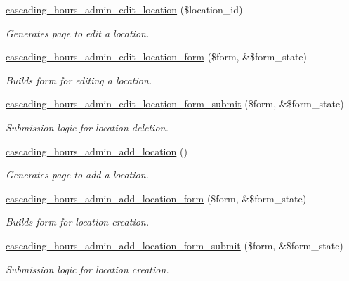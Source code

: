 \begin{DoxyCompactItemize}
\hyperlink{cascading__hours_8admin_8php_a85421c52ee7021f3d6fb7febc583a4a3_a85421c52ee7021f3d6fb7febc583a4a3}{cascading\+\_\+hours\+\_\+admin\+\_\+edit\+\_\+location} (\$location\+\_\+id)
\begin{DoxyCompactList}\small\item\em Generates page to edit a location. \end{DoxyCompactList}\item 
\hyperlink{cascading__hours_8admin_8php_a8706149902213051645f6b3d5bff772e_a8706149902213051645f6b3d5bff772e}{cascading\+\_\+hours\+\_\+admin\+\_\+edit\+\_\+location\+\_\+form} (\$form, \&\$form\+\_\+state)
\begin{DoxyCompactList}\small\item\em Builds form for editing a location. \end{DoxyCompactList}\item 
\hyperlink{cascading__hours_8admin_8php_a9956edb6cdf88b12f3e7fadcf9e36e4b_a9956edb6cdf88b12f3e7fadcf9e36e4b}{cascading\+\_\+hours\+\_\+admin\+\_\+edit\+\_\+location\+\_\+form\+\_\+submit} (\$form, \&\$form\+\_\+state)
\begin{DoxyCompactList}\small\item\em Submission logic for location deletion. \end{DoxyCompactList}\item 
\hyperlink{cascading__hours_8admin_8php_abf9ca663615d8da220c58f2b39232bc8_abf9ca663615d8da220c58f2b39232bc8}{cascading\+\_\+hours\+\_\+admin\+\_\+add\+\_\+location} ()
\begin{DoxyCompactList}\small\item\em Generates page to add a location. \end{DoxyCompactList}\item 
\hyperlink{cascading__hours_8admin_8php_a4f4ac8068097a34c4e7a11b0157d3fb5_a4f4ac8068097a34c4e7a11b0157d3fb5}{cascading\+\_\+hours\+\_\+admin\+\_\+add\+\_\+location\+\_\+form} (\$form, \&\$form\+\_\+state)
\begin{DoxyCompactList}\small\item\em Builds form for location creation. \end{DoxyCompactList}\item 
\hyperlink{cascading__hours_8admin_8php_a405957141431d872e0a35251149a61bc_a405957141431d872e0a35251149a61bc}{cascading\+\_\+hours\+\_\+admin\+\_\+add\+\_\+location\+\_\+form\+\_\+submit} (\$form, \&\$form\+\_\+state)
\begin{DoxyCompactList}\small\item\em Submission logic for location creation. \end{DoxyCompactList}\item 

\end{DoxyCompactItemize}
